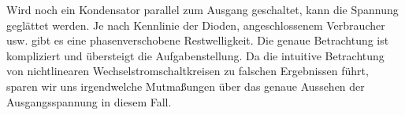 \documentclass[a4paper,german,12pt,smallheadings]{scrartcl}
\begin{document}
Wird noch ein Kondensator parallel zum Ausgang geschaltet, kann die Spannung
geglättet werden. Je nach Kennlinie der Dioden, angeschlossenem Verbraucher
usw. gibt es eine phasenverschobene Restwelligkeit. Die genaue Betrachtung ist
kompliziert und übersteigt die Aufgabenstellung. Da die intuitive Betrachtung
von nichtlinearen Wechselstromschaltkreisen zu falschen Ergebnissen führt,
sparen wir uns irgendwelche Mutmaßungen über das genaue Aussehen der
Ausgangsspannung in diesem Fall.
\end{document}

